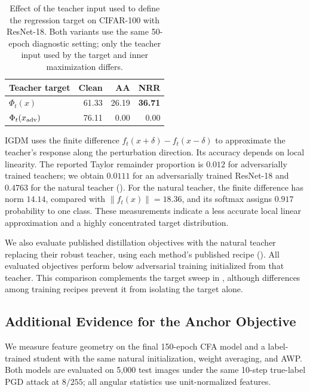 \begin{table}[!htbp]
  \centering\small\setlength{\tabcolsep}{5pt}
  \caption{Effect of the teacher input used to define the regression target on
  CIFAR-100 with ResNet-18. Both variants use the same 50-epoch diagnostic
  setting; only the teacher input used by the target and inner maximization
  differs.}
  \label{tab:teacherread}
  \begin{tabular}{lrrr}
    \toprule
    Teacher target & Clean & AA & NRR \\
    \midrule
    \(\Phi_t(x)\) & 61.33 & 26.19 & \textbf{36.71} \\
    \(\Phi_t(x_{\rm adv})\) & 76.11 & 0.00 & 0.00 \\
    \bottomrule
  \end{tabular}
\end{table}

IGDM \citep{igdm} uses the finite difference $f_t(x+\delta)-f_t(x-\delta)$ to approximate the
teacher's response along the perturbation direction. Its accuracy depends on local linearity.
The reported Taylor remainder proportion is $0.012$ for adversarially trained teachers; we obtain
$0.0111$ for an adversarially trained ResNet-18 and $0.4763$ for the natural teacher
(). For the natural teacher, the finite difference has norm $14.14$, compared
with $\lVert f_t(x)\rVert=18.36$, and its softmax assigns $0.917$ probability to one class.
These measurements indicate a less accurate local linear approximation and a highly concentrated
target distribution.

We also evaluate published distillation objectives with the natural teacher replacing their robust
teacher, using each method's published recipe (). All evaluated objectives
perform below adversarial training initialized from that teacher. This comparison complements the
target sweep in , although differences among training recipes prevent it from
isolating the target alone.

\subsection{Additional Evidence for the Anchor Objective}
\label{app:anchor_measurements}
\label{sec:empirical_geometry}

We measure feature geometry on the final 150-epoch CFA model and a label-trained student with the
same natural initialization, weight averaging, and AWP. Both models are evaluated on 5,000 test
images under the same 10-step true-label PGD attack at $8/255$; all angular statistics use
unit-normalized features.

